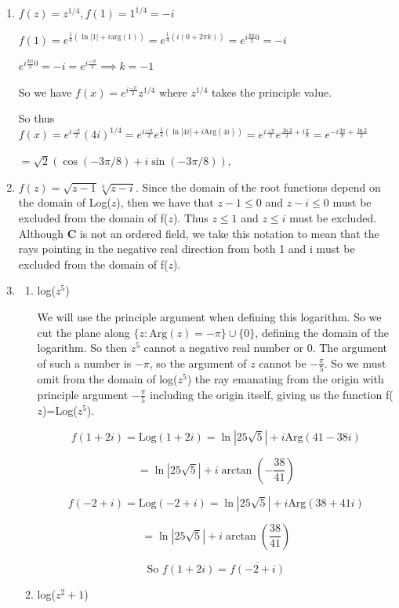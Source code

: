 \documentclass{article}
\newcommand{\C}{\mathbf{C}}
\newcommand{\Log}{\text{Log}}
\newcommand{\Arg}{\text{Arg}}
\begin{document}
\begin{enumerate}
	\item $f(z)=z^{1/4}, f(1)=1^{1/4}=-i$
	
	$f(1)=e^{\frac{1}{4}(\ln|1|+i\text{arg}(1))}=e^{\frac{1}{4}(i(0+2\pi k))}=e^{i\frac{k\pi}{2}0}=-i $
	
	$e^{i\frac{k\pi}{2}0}=-i=e^{i\frac{-\pi}{2}} \implies k=-1$
	
	So we have $f(x)=e^{i\frac{-\pi}{2}}z^{1/4}$ where $z^{1/4}$ takes the principle value.
	
	So thus $f(x)=e^{i\frac{-\pi}{2}}(4i)^{1/4}=e^{i\frac{-\pi}{2}}e^{\frac{1}{4}(\ln|4i|+i\text{Arg}(4i))}=e^{i\frac{-\pi}{2}}e^{\frac{\ln2}{2}+i\frac{\pi}{8}}=e^{-i\frac{3\pi}{8}+\frac{\ln2}{2}}$
	
	$=\sqrt{2}(\cos(-3\pi/8)+i\sin(-3\pi/8))$,
	
	\item $f(z)=\sqrt{z-1}\sqrt[3]{z-i}$. Since the domain of the root functions depend on the domain of Log($z$), then we have that $z-1\leq0$ and $z-i\leq 0$ must be excluded from the domain of f($z$). Thus $z \leq 1$ and $z \leq i$ must be excluded. Although $\C$ is not an ordered field, we take this notation to mean that the rays pointing in the negative real direction from both 1 and i must be excluded from the domain of f($z$).
	
	\item
	\begin{enumerate}
		\item log($z^5$)
		
		We will use the principle argument when defining this logarithm. So we cut the plane along $\{ z : \text{Arg}(z)=-\pi \}\cup\{0\}$, defining the domain of the logarithm. So then $z^5$ cannot a negative real number or 0. The argument of such a number is $-\pi$, so the argument of $z$ cannot be $-\frac{\pi}{5}$. So we must omit from the domain of log($z^5$) the ray emanating from the origin with principle argument $-\frac{\pi}{5}$ including the origin itself, giving us the function f($z$)=Log($z^5$).
		
		\[ f(1+2i)=\Log(1+2i)=\ln|25\sqrt{5}|+i\Arg(41-38i) \]
		
		\[ =\ln|25\sqrt{5}|+i\arctan(-\frac{38}{41})\]
		
		\[ f(-2+i)=\Log(-2+i)=\ln|25\sqrt{5}|+i\Arg(38+41i) \]
		
		\[ =\ln|25\sqrt{5}|+i\arctan(\frac{38}{41})\]
		
		\[ \text{So } f(1+2i)=\overline{f(-2+i)}\]
		
		\item log($z^2+1$)
		

\end{enumerate}
\end{enumerate}
\end{document}
